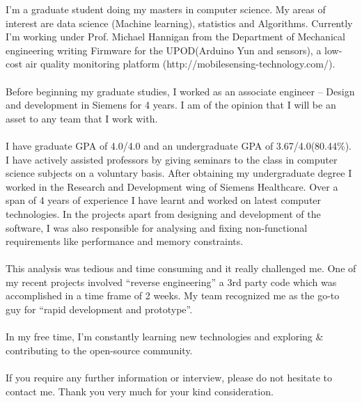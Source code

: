 \documentclass{coverletter}
\begin{document}
\begin{letterheader}

\end{letterheader}

\begin{letter}
\subject{Application for Graduate internship programme at Siemens Medical solutions.}
\begin{content}

I’m a graduate student doing my masters in computer science. My areas of interest are data science (Machine learning), statistics and Algorithms. Currently I’m working under Prof. Michael Hannigan from the Department of Mechanical engineering writing Firmware for the UPOD(Arduino Yun and sensors), a low-cost air quality monitoring platform (http://mobilesensing-technology.com/).\\\\
Before beginning my graduate studies, I worked as an associate engineer – Design and development in Siemens for 4 years. I am of the opinion that I will be an asset to any team that I work with.\\\\
I have graduate GPA of 4.0/4.0 and an undergraduate GPA of 3.67/4.0(80.44\%). I have actively assisted professors by giving seminars to the class in computer science subjects on a voluntary basis. After obtaining my undergraduate degree I worked in the Research and Development wing of Siemens Healthcare. Over a span of 4 years of experience I have learnt and worked on latest computer technologies. In the projects apart from designing and development of the software, I was also responsible for analysing and fixing non-functional requirements like performance and memory constraints.\\\\
This analysis was tedious and time consuming and it really challenged me. One of my recent projects involved “reverse engineering” a 3rd party code which was accomplished in a time frame of 2 weeks. My team recognized me as the go-to guy for “rapid development and prototype”.\\\\
In my free time, I’m constantly learning new technologies and exploring \& contributing to the open-source community.\\\\
If you require any further information or interview, please do not hesitate to contact me. Thank you very much for your kind consideration.

\end{content}
\end{letter}


\begin{contactdetails}
\end{contactdetails}
\end{document}
